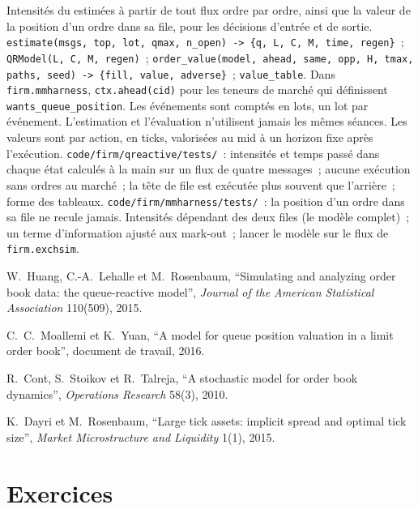 \begin{build}
 Intensités du  estimées à partir de tout flux ordre par ordre, ainsi que la valeur de la position d'un ordre dans sa file, pour les décisions d'entrée et de
sortie.
 \texttt{estimate(msgs, top, lot, qmax, n\_open) -> \{q, L, C, M, time, regen\}}~; \texttt{QRModel(L, C, M, regen)}~;
\texttt{order\_value(model, ahead, same, opp, H, tmax, paths, seed) -> \{fill, value, adverse\}}~; \texttt{value\_table}. Dans
\texttt{firm.mmharness}, \texttt{ctx.ahead(cid)} pour les teneurs de marché qui définissent \texttt{wants\_queue\_position}.
 Les événements sont comptés en lots, un lot par événement. L'estimation et l'évaluation n'utilisent jamais les mêmes séances. Les valeurs sont par action, en
ticks, valorisées au mid à un horizon fixe après l'exécution.
 \texttt{code/firm/qreactive/tests/}~: intensités et temps passé dans chaque état calculés à la main sur un flux de quatre messages~; aucune exécution sans ordres au
marché~; la tête de file est exécutée plus souvent que l'arrière~; forme des tableaux. \texttt{code/firm/mmharness/tests/}~: la position d'un ordre dans sa file ne recule jamais.
 Intensités dépendant des deux files (le modèle complet)~; un terme d'information ajusté aux mark-out~; lancer le modèle sur le
flux de \texttt{firm.exchsim}.
\end{build}

\begin{omsources}
\item W.~Huang, C.-A.~Lehalle et M.~Rosenbaum, ``Simulating and analyzing order book data: the queue-reactive model'', \emph{Journal of the American
Statistical Association} 110(509), 2015.
\item C.~C.~Moallemi et K.~Yuan, ``A model for queue position valuation in a limit order book'', document de travail, 2016.
\item R.~Cont, S.~Stoikov et R.~Talreja, ``A stochastic model for order book dynamics'', \emph{Operations Research} 58(3), 2010.
\item K.~Dayri et M.~Rosenbaum, ``Large tick assets: implicit spread and optimal tick size'', \emph{Market Microstructure and Liquidity} 1(1), 2015.
\end{omsources}

\section{Exercices}

